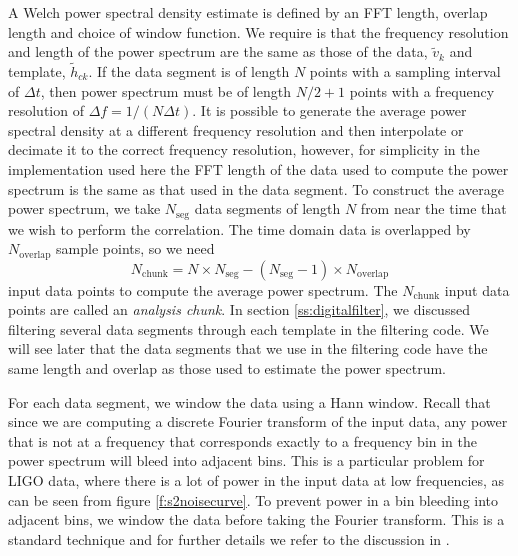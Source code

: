 A Welch power spectral density estimate is defined by an FFT length, overlap
length and choice of window function.  We require is that the frequency
resolution and length of the power spectrum are the same as those of the data,
$\tilde{v}_k$ and template, $\tilde{h}_{ck}$. If the data segment is of length
$N$ points with a sampling interval of $\Delta t$, then power spectrum must be
of length $N/2 + 1$ points with a frequency resolution of $\Delta f =
1/(N\Delta t)$.  It is possible to generate the average power spectral density
at a different frequency resolution and then interpolate or decimate it to the
correct frequency resolution, however, for simplicity in the implementation
used here the FFT length of the data used to compute the power spectrum is the
same as that used in the data segment.  To construct the average power
spectrum, we take $N_\mathrm{seg}$ data segments of length $N$ from near the
time that we wish to perform the correlation. The time domain data is
overlapped by $N_\mathrm{overlap}$ sample points, so we need
\begin{equation}
N_\mathrm{chunk} = 
N \times N_\mathrm{seg} - ( N_\mathrm{seg} - 1 ) \times N_\mathrm{overlap}
\end{equation}
input data points to compute the average power spectrum. The
$N_\mathrm{chunk}$ input data points are called an \emph{analysis chunk}.
In section \ref{ss:digitalfilter}, we discussed filtering several data
segments through each template in the filtering code. We will see later that
the data segments that we use in the filtering code have the same length and 
overlap as those used to estimate the power spectrum. 

For each data segment, we window the data using a Hann window. Recall that
since we are computing a discrete Fourier transform of the input data, any
power that is not at a frequency that corresponds exactly to a frequency bin
in the power spectrum will bleed into adjacent bins. This is a particular
problem for LIGO data, where there is a lot of power in the input data at low
frequencies, as can be seen from figure \ref{f:s2noisecurve}. To prevent
power in a bin bleeding into adjacent bins, we window the data before taking
the Fourier transform. This is a standard technique and for further details we
refer to the discussion in \cite{Press:1992}. 

